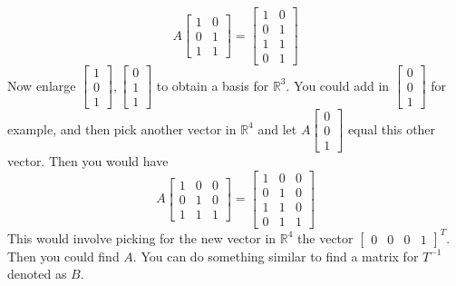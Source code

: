 \documentclass{ximera}
\begin{document}
\begin{problem}
\begin{hint}
\begin{equation*}
A\left[
\begin{array}{cc}
1 & 0 \\
0 & 1 \\
1 & 1
\end{array}
\right] =\left[
\begin{array}{cc}
1 & 0 \\
0 & 1 \\
1 & 1 \\
0 & 1
\end{array}
\right]
\end{equation*}
Now enlarge $\left[
\begin{array}{c}
1 \\
0 \\
1
\end{array}
\right] ,\left[
\begin{array}{c}
0 \\
1 \\
1
\end{array}
\right] $ to obtain a basis for $\mathbb{R}^{3}$. You could add in $\left[
\begin{array}{c}
0 \\
0 \\
1
\end{array}
\right] $ for example, and then pick another vector in $\mathbb{R}^{4}$ and
let $A\left[
\begin{array}{c}
0 \\
0 \\
1
\end{array}
\right] $ equal this other vector. Then you would have
\begin{equation*}
A\left[
\begin{array}{ccc}
1 & 0 & 0 \\
0 & 1 & 0 \\
1 & 1 & 1
\end{array}
\right] =\left[
\begin{array}{ccc}
1 & 0 & 0 \\
0 & 1 & 0 \\
1 & 1 & 0 \\
0 & 1 & 1
\end{array}
\right]
\end{equation*}
This would involve picking for the new vector in $\mathbb{R}^{4}$ the vector
$\left[
\begin{array}{cccc}
0 & 0 & 0 & 1
\end{array}
\right] ^{T}.$ Then you could find $A$. You can do something similar to find
a matrix for $T^{-1}$ denoted as $B$.

\end{hint}
\end{problem}
\end{document}
